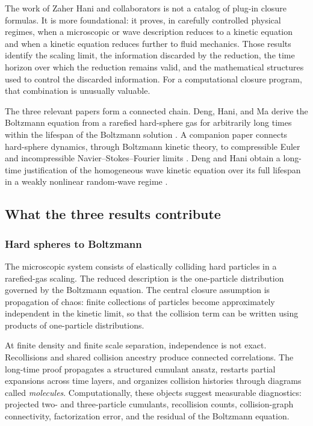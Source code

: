 \documentclass[11pt]{article}
\begin{document}
The work of Zaher Hani and collaborators is not a catalog of plug-in closure formulas. It is more foundational: it proves, in carefully controlled physical regimes, when a microscopic or wave description reduces to a kinetic equation and when a kinetic equation reduces further to fluid mechanics. Those results identify the scaling limit, the information discarded by the reduction, the time horizon over which the reduction remains valid, and the mathematical structures used to control the discarded information. For a computational closure program, that combination is unusually valuable.

The three relevant papers form a connected chain. Deng, Hani, and Ma derive the Boltzmann equation from a rarefied hard-sphere gas for arbitrarily long times within the lifespan of the Boltzmann solution \citep{denghani2025boltzmann}. A companion paper connects hard-sphere dynamics, through Boltzmann kinetic theory, to compressible Euler and incompressible Navier--Stokes--Fourier limits \citep{denghani2025hilbert}. Deng and Hani obtain a long-time justification of the homogeneous wave kinetic equation over its full lifespan in a weakly nonlinear random-wave regime \citep{denghani2024wave}.

\subsection{What the three results contribute}

\subsubsection{Hard spheres to Boltzmann}

The microscopic system consists of elastically colliding hard particles in a rarefied-gas scaling. The reduced description is the one-particle distribution governed by the Boltzmann equation. The central closure assumption is propagation of chaos: finite collections of particles become approximately independent in the kinetic limit, so that the collision term can be written using products of one-particle distributions.

At finite density and finite scale separation, independence is not exact. Recollisions and shared collision ancestry produce connected correlations. The long-time proof propagates a structured cumulant ansatz, restarts partial expansions across time layers, and organizes collision histories through diagrams called \emph{molecules}. Computationally, these objects suggest measurable diagnostics: projected two- and three-particle cumulants, recollision counts, collision-graph connectivity, factorization error, and the residual of the Boltzmann equation.
\end{document}
